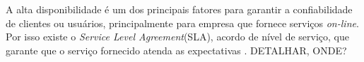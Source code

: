 A alta disponibilidade é um dos principais fatores para garantir a confiabilidade de clientes ou usuários, principalmente para empresa que 
fornece serviços \textit{on-line}. Por isso existe o \textit{Service Level Agreement}(SLA), acordo de nível de serviço, 
que garante que o serviço fornecido atenda as expectativas \cite{smith2010}. DETALHAR, ONDE?


